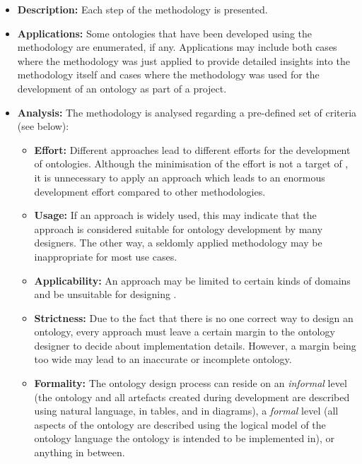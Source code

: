 \begin{itemize}
  \item \textbf{Description:} Each step of the methodology is presented.
  
  \item \textbf{Applications:} Some ontologies that have been developed using the methodology are enumerated, if any. Applications may include both cases where the methodology was just applied to provide detailed insights into the methodology itself and cases where the methodology was used for the development of an ontology as part of a project.
  
  \item \textbf{Analysis:} The methodology is analysed regarding a pre-defined set of criteria (see below):
    \begin{itemize}
      \item \textbf{Effort:} Different approaches lead to different efforts for the development of ontologies. Although the minimisation of the effort is not a target of \smarthomeweather, it is unnecessary to apply an approach which leads to an enormous development effort compared to other methodologies.
      
      \item \textbf{Usage:} If an approach is widely used, this may indicate that the approach is considered suitable for ontology development by many designers. The other way, a seldomly applied methodology may be inappropriate for most use cases.
      
      \item \textbf{Applicability:} An approach may be limited to certain kinds of domains and be unsuitable for designing \smarthomeweather.
      
      \item \textbf{Strictness:} Due to the fact that there is no one correct way to design an ontology, every approach must leave a certain margin to the ontology designer to decide about implementation details. However, a margin being too wide may lead to an inaccurate or incomplete ontology.
      
      \item \textbf{Formality:} The ontology design process can reside on an \emph{informal} level (the ontology and all artefacts created during development are described using natural language, in tables, and in diagrams), a \emph{formal} level (all aspects of the ontology are described using the logical model of the ontology language the ontology is intended to be implemented in), or anything in between.
      

\end{itemize}
\end{itemize}
